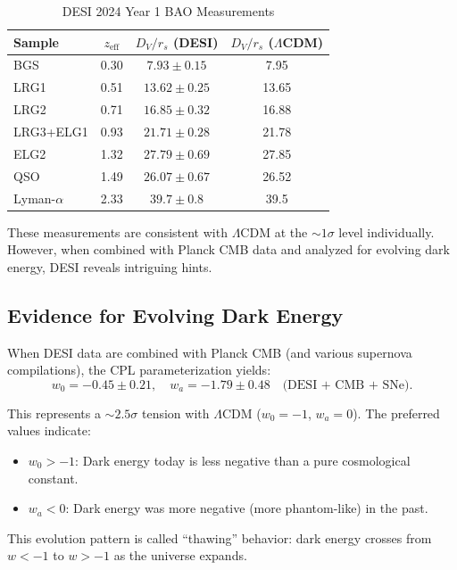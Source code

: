 \documentclass[11pt,a4paper]{article}
\theoremstyle{definition}
\theoremstyle{remark}
\begin{document}
\begin{table}[H]
\centering
\caption{DESI 2024 Year 1 BAO Measurements}
\label{tab:desi_bao}
\begin{tabular}{@{}lccc@{}}
\toprule
Sample & $z_{\mathrm{eff}}$ & $D_V/r_s$ (DESI) & $D_V/r_s$ ($\Lambda$CDM) \\
\midrule
BGS & 0.30 & $7.93 \pm 0.15$ & 7.95 \\
LRG1 & 0.51 & $13.62 \pm 0.25$ & 13.65 \\
LRG2 & 0.71 & $16.85 \pm 0.32$ & 16.88 \\
LRG3+ELG1 & 0.93 & $21.71 \pm 0.28$ & 21.78 \\
ELG2 & 1.32 & $27.79 \pm 0.69$ & 27.85 \\
QSO & 1.49 & $26.07 \pm 0.67$ & 26.52 \\
Lyman-$\alpha$ & 2.33 & $39.7 \pm 0.8$ & 39.5 \\
\bottomrule
\end{tabular}
\end{table}

These measurements are consistent with $\Lambda$CDM at the $\sim 1\sigma$ level individually. However, when combined with Planck CMB data and analyzed for evolving dark energy, DESI reveals intriguing hints.

\subsection{Evidence for Evolving Dark Energy}
\label{sec:desi_evolving}

When DESI data are combined with Planck CMB (and various supernova compilations), the CPL parameterization yields:
\begin{equation}
\boxed{w_0 = -0.45 \pm 0.21, \quad w_a = -1.79 \pm 0.48 \quad \text{(DESI + CMB + SNe)}.}
\end{equation}

This represents a $\sim 2.5\sigma$ tension with $\Lambda$CDM ($w_0 = -1$, $w_a = 0$). The preferred values indicate:
\begin{itemize}[leftmargin=*, itemsep=0.2em]
\item $w_0 > -1$: Dark energy today is less negative than a pure cosmological constant.
\item $w_a < 0$: Dark energy was more negative (more phantom-like) in the past.
\end{itemize}

This evolution pattern is called ``thawing'' behavior: dark energy crosses from $w < -1$ to $w > -1$ as the universe expands.
\end{document}

